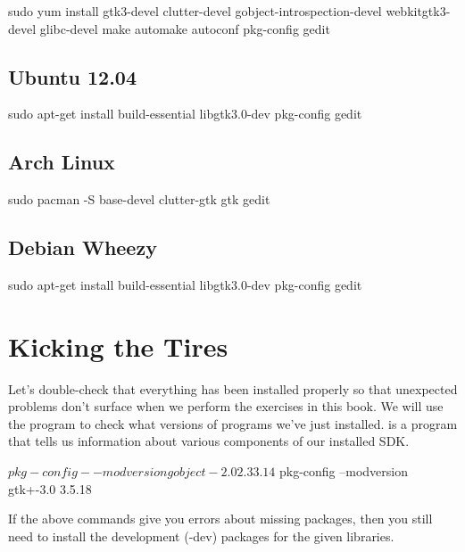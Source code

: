\begin{Terminal}
sudo yum install gtk3-devel clutter-devel gobject-introspection-devel webkitgtk3-devel glibc-devel make automake autoconf pkg-config gedit
\end{Terminal}


\subsection{Ubuntu 12.04}

\begin{Terminal}
sudo apt-get install build-essential libgtk3.0-dev pkg-config gedit
\end{Terminal}


\subsection{Arch Linux}
\begin{Terminal}
sudo pacman -S base-devel clutter-gtk gtk gedit
\end{Terminal}

\subsection{Debian Wheezy}

\begin{Terminal}
sudo apt-get install build-essential libgtk3.0-dev pkg-config gedit
\end{Terminal}


\section{Kicking the Tires}

Let's double-check that everything has been installed properly so that 
unexpected problems don't surface when we perform the exercises in this book.
We will use the  program to check what versions of programs
we've just installed.  is a program that tells us information
about various components of our installed SDK.

\begin{Terminal}
$ pkg-config --modversion gobject-2.0
2.33.14

$ pkg-config --modversion gtk+-3.0
3.5.18
\end{Terminal}

If the above commands give you errors about missing packages, then you still
need to install the development (-dev) packages for the given libraries.


